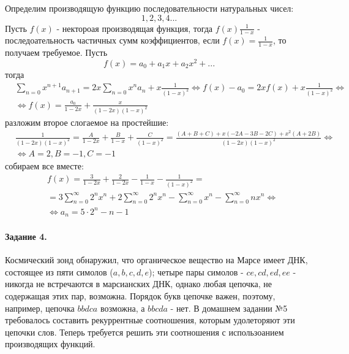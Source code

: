 \documentclass[a4paper,12pt]{article}
\begin{document}
\begin{Solution}
Определим производящую функцию последовательности натуральных чисел:
\[
	1, 2, 3, 4 ...
\]
Пусть $f\left(x\right)$ - нектороая производящая функция, тогда $f\left(x\right) \frac{1}{1-x}$ - последоательность частичных сумм коэффициентов, если $f\left(x\right) = \frac{1}{1-x}$, то получаем требуемое.
Пусть
\[
	f\left(x\right) = a_0 + a_1 x + a_2 x^2 + ...
\]
тогда
\[
	\begin{split}
		& \sum_{n=0}x^{n+1} a_{n+1} = 2 x\sum_{n=0}x^n a_n + x\frac{1}{{\left(1-x\right)}^2} \Leftrightarrow f\left(x\right) - a_0 = 2x f\left(x\right) + x\frac{1}{{\left(1-x\right)}^2} \Leftrightarrow \\
		& \Leftrightarrow f\left(x\right) = \frac{a_0}{1-2x} + \frac{x}{{\left(1-2x\right)\left(1-x\right)}^2}
	\end{split}
\]
разложим второе слогаемое на простейшие:
\[
	\begin{split}
		& \frac{1}{\left(1-2x\right){\left(1-x\right)}^2} = \frac{A}{1-2x} + \frac{B}{1-x} + \frac{C}{{\left(1-x\right)}^2} = \frac{\left(A+B+C\right) + x\left(-2A-3B-2C\right) + x^2 \left(A + 2B\right)}{\left(1-2x\right){\left(1-x\right)}^2} \Leftrightarrow \\
		& \Leftrightarrow A = 2, B = -1, C = -1
	\end{split}
\]
собираем все вместе:
\[
	\begin{split}
		& f \left(x\right) = \frac{3}{1-2x} + \frac{2}{1-2x} - \frac{1}{1-x} - \frac{1}{{\left(1-x\right)}^2} = \\
		& = 3\sum_{n=0}^{\infty} 2^n x^n + 2\sum_{n=0}^{\infty} 2^n x^n - \sum_{n=0}^{\infty} x^n - \sum_{n=0}^{\infty} n x^n \Leftrightarrow \\
		& \Leftrightarrow a_n = 5 \cdot 2^n - n - 1
	\end{split}
\]
\end{Solution}

\paragraph{Задание 4.} Космический зонд обнаружил, что органическое вещество на Марсе имеет ДНК, состоящее из пяти симолов ($a,b,c,d,e$); четыре пары симолов - $ce, cd, ed, ee$ - никогда не встречаются в марсианских ДНК, однако любая цепочка, не содержащая этих пар, возможна. Порядок букв  цепочке важен, поэтому, например, цепочка $bbdca$ возможна, а $bbcda$ - нет. В домашнем задании №5 требовалось составить рекуррентные соотношения, которым удолеторяют эти цепочки слов. Теперь требуется решить эти соотношения с использоанием производящих функций.
\end{document}
